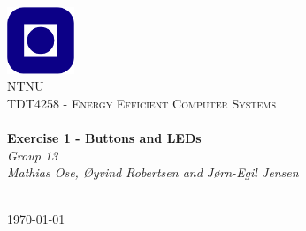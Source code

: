 \begin{titlepage}
\begin{center}
\includegraphics[width=0.15\textwidth]{img/ntnulogo.PNG}~\\[1cm]

\textsc{\LARGE NTNU}\\[1.5cm]

\textsc{\Large TDT4258 - Energy Efficient Computer Systems}\\[0.5cm]

\HRule \\[0.4cm]
{ \huge \bfseries Exercise 1 - Buttons and LEDs}\\[0.5cm]
{\Large \textit{Group 13}}\\[0.3cm]
{\large \textit{Mathias Ose, \O yvind Robertsen and J\o rn-Egil Jensen}}\\[0.2cm]
\HRule \\[1.5cm]



\vfill

{\large \today}
\end{center}
\end{titlepage}